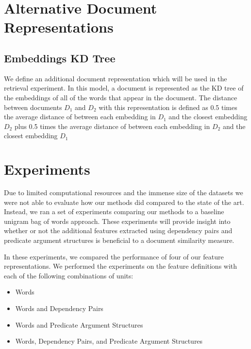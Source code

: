 \documentclass[11pt]{article}
\begin{document}
\section{Alternative Document Representations}

\subsection{Embeddings KD Tree}

We define an additional document representation which will be used in the retrieval experiment. In this model, a document is represented as the KD tree of the embeddings of all of the words that appear in the document. The distance between documents $D_1$ and $D_2$ with this representation is defined as 0.5 times the average distance of between each embedding in $D_1$  and the closest embedding $D_2$ plus 0.5 times the average distance of between each embedding in $D_2$  and the closest embedding $D_1$


\section{Experiments}

\newcommand{\headcol}{\rowcolor{tableheadcolor}} %



Due to limited computational resources and the immense size of the datasets we were not able to evaluate how our methods did compared to the state of the art. Instead, we ran a set of experiments comparing our methods to a baseline unigram bag of words approach. These experiments will provide insight into whether or not the additional features extracted using dependency pairs and predicate argument structures is beneficial to a document similarity measure. 

In these experiments, we compared the performance of four of our feature representations. We performed the experiments on the feature definitions with each of the following combinations of units:

\begin{itemize}
\item Words
\item Words and Dependency Pairs 
\item Words and Predicate Argument Structures
\item Words, Dependency Pairs, and Predicate Argument Structures
\end{itemize}
\end{document}
